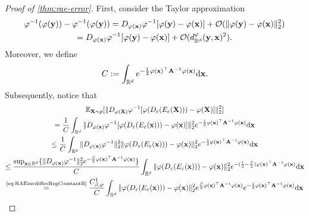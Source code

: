 \begin{proof}[Proof of \ref{thm:rae-error}]
First, consider the Taylor approximation
    \begin{multline}
        \varphi^{-1}(\varphi(\mathbf{y})) - \varphi^{-1}(\varphi(\mathbf{y})) = D_{\varphi(\mathbf{x})} \varphi^{-1} [\varphi(\mathbf{y}) - \varphi(\mathbf{x})]  + \mathcal{O}(\|\varphi(\mathbf{y}) - \varphi(\mathbf{x})\|_2^2) \\
        = D_{\varphi(\mathbf{x})} \varphi^{-1} [\varphi(\mathbf{y}) - \varphi(\mathbf{x})]  + \mathcal{O}(d_{\mathbb{R}^{d}}^\varphi(\mathbf{y},\mathbf{x})^2).
        \label{eq:thm-l2-bound-rae-taylor-phiinv-phi}
    \end{multline}
    Moreover, we define
    \begin{equation}
        C :=  \int_{\mathbb{R}^{d}} e^{-\frac{1}{2} \varphi(\mathbf{x})^\top \mathbf{A}^{-1} \varphi(\mathbf{x})} \mathrm{d} \mathbf{x}.
        \label{eq:RAEnormalizationConstant-2}
    \end{equation}
Subsequently, notice that
    \begin{multline}
        \mathbb{E}_{\stoVector \sim \density}[\|D_{\diffeo(\stoVector)} \diffeo^{-1} [\diffeo(D_\RAErelerror(E_\RAErelerror(\stoVector))) - \diffeo(\stoVector)]\|_2^2] \\
        = \frac{1}{\RAEnormalizationConstant}\int_{\Real^\dimInd} \|D_{\diffeo(\Vector)} \diffeo^{-1} [\diffeo(D_\RAErelerror(E_\RAErelerror(\Vector))) - \diffeo(\Vector)]\|_2^2 e^{-\frac{1}{2} \diffeo(\Vector)^\top \spdMatrix^{-1} \diffeo(\Vector)} \mathrm{d} \Vector\\
        \leq \frac{1}{\RAEnormalizationConstant} \int_{\Real^\dimInd} \|D_{\diffeo(\Vector)} \diffeo^{-1}\|_2^2\|\diffeo(D_\RAErelerror(E_\RAErelerror(\Vector))) - \diffeo(\Vector)\|_2^2 e^{-\frac{1}{2} \diffeo(\Vector)^\top \spdMatrix^{-1} \diffeo(\Vector)} \mathrm{d} \Vector \\
        \leq \frac{\sup_{\Vector\in \Real^{\dimInd}} \{ \| D_{\diffeo(\Vector)} \diffeo^{-1}\|_2^2 e^{-\frac{\RAEboundParam}{2} \diffeo(\Vector)^\top \spdMatrix^{-1} \diffeo(\Vector) } \}}{\RAEnormalizationConstant} \int_{\Real^\dimInd} \|\diffeo(D_\RAErelerror(E_\RAErelerror(\Vector))) - \diffeo(\Vector)\|_2^2 e^{-(\frac{1}{2} - \frac{\RAEboundParam}{2}) \diffeo(\Vector)^\top \spdMatrix^{-1} \diffeo(\Vector)} \mathrm{d} \Vector\\
        \overset{\text{\ref{eq:RAEinvdiffeoRegConstantB}}}{=} \frac{\RAEinvdiffeoRegConstantB}{\RAEnormalizationConstant} \int_{\Real^\dimInd} \|\diffeo(D_\RAErelerror(E_\RAErelerror(\Vector))) - \diffeo(\Vector)\|_2^2 e^{\frac{\RAEboundParam}{2} \diffeo(\Vector)^\top \spdMatrix^{-1} \diffeo(\Vector)} e^{-\frac{1}{2}\diffeo(\Vector)^\top \spdMatrix^{-1} \diffeo(\Vector)} \mathrm{d} \Vector\\

\end{multline}
\end{proof}
